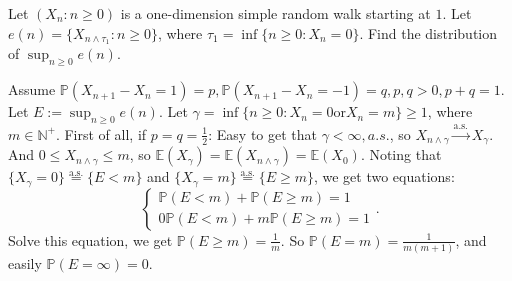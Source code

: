 \documentclass{ctexart}
\begin{document}
\begin{problem}\label{pro:2}
  Let \((X_n: n \geq 0)\) is a one-dimension simple random walk starting at \(1\). Let \(e(n)=\{X_{n \wedge \tau_1}: n \geq 0\}\), where \(\tau_1=\inf \{n \geq 0: X_n=0\}\).
  Find the distribution of \(\sup_{n \geq 0}e(n)\).
\end{problem}
\begin{solution}
  Assume \(\mathbb{P}(X_{n + 1}-X_n=1)=p,\mathbb{P}(X_{n + 1}-X_n=-1)=q, p,q >0, p + q=1\).
  Let \(E := \sup_{n \geq 0}e(n)\).
  Let \(\gamma = \inf \{n \geq 0 : X_n=0 \text{or} X_n=m\} \geq 1\), where \(m \in \mathbb{N}^+\).
  First of all, if \(p=q=\frac{1}{2}\):
  Easy to get that \(\gamma<\infty,a. s.\), so \(X_{n \wedge \gamma} \overset{\text{a.s.}}{\to} X_{\gamma}\).
  And \(0 \leq X_{n \wedge \gamma} \leq m\), so \(\mathbb{E}(X_{\gamma})=\mathbb{E}(X_{n \wedge \gamma})=\mathbb{E}(X_0)\).
  Noting that \(\{X_\gamma =0\}\overset{\text{a.s.}}{=}\{E<m\}\) and \(\{X_{\gamma}= m\}\overset{\text{a.s.}}{=}\{E \geq m\}\),
  we get two equations:
  \[
    \begin{cases}
      \mathbb{P}(E<m)+\mathbb{P}(E \geq m)=1 \\
      0\mathbb{P}(E<m)+m\mathbb{P}(E \geq m) =1
    \end{cases}.
  \]
  Solve this equation, we get \(\mathbb{P}(E \geq m)=\frac{1}{m}\).
  So \(\mathbb{P}(E=m)=\frac{1}{m(m+1)}\), and easily \(\mathbb{P}(E=\infty)=0\).


\end{solution}
\end{document}
